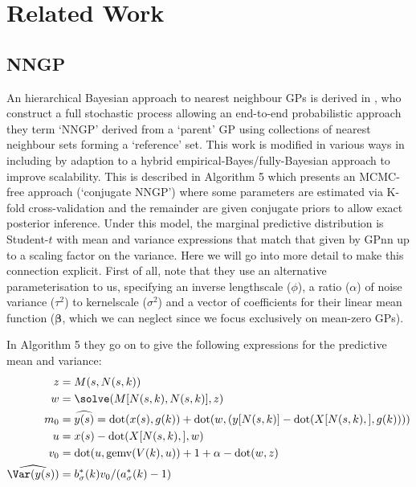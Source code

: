 \section{Related Work}
\label{appx:related_work}

\subsection{NNGP}
\label{appx:nngp}

An hierarchical Bayesian approach to nearest neighbour GPs is derived in \cite{Datta2016}, who construct a full stochastic process allowing an end-to-end probabilistic approach they term `NNGP' derived from a `parent' GP using collections of nearest neighbour sets forming a `reference' set. This work is modified in various ways in \cite{Finley2019} including by adaption to a hybrid empirical-Bayes/fully-Bayesian approach to improve scalability. This is described in Algorithm 5 which presents an MCMC-free approach (`conjugate NNGP') where some parameters are estimated via K-fold cross-validation and the remainder are given conjugate priors to allow exact posterior inference. Under this model, the marginal predictive distribution is Student-\(t\) with mean and variance expressions that match that given by GPnn up to a scaling factor on the variance. Here we will go into more detail to make this connection explicit. First of all, note that they use an alternative parameterisation to us, specifying an inverse lengthscale (\(\phi\)), a ratio (\(\alpha\)) of noise variance (\(\tau^2\)) to kernelscale (\(\sigma^2\)) and a vector of coefficients for their linear mean function (\(\bm{\beta}\), which we can neglect since we focus exclusively on mean-zero GPs). 

In Algorithm 5 they go on to give the following expressions for the predictive mean and variance:
\begin{align*}
    z &= M(s,N(s,k)) \\
    w &= \solve(M[N(s,k),N(s,k)],z) \\
    m_0 &= \widehat{y(s)} = \textrm{dot}(x(s), g(k)) + \textrm{dot}(w,(y[N(s,k)] - \textrm{dot}(X[N(s,k),],g(k)))) \\
    u &= x(s) - \textrm{dot}(X[N(s,k),],w) \\
    v_0 &= \textrm{dot}(u, \textrm{gemv}(V(k),u)) + 1 + \alpha - \textrm{dot}(w,z)  \\
    \widehat{\Var(y(s))} &= b^*_\sigma(k)v_0/(a^*_\sigma(k) - 1) 
\end{align*}


